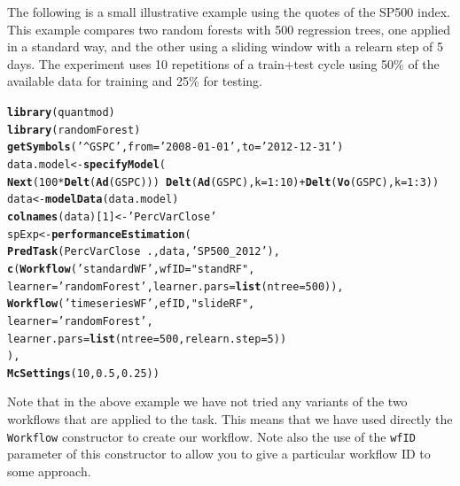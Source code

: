 \documentclass[10pt,a4paper]{article}\usepackage[]{graphicx}\usepackage[]{color}
\makeatletter
\newcommand{\hlnum}[1]{\textcolor[rgb]{0.686,0.059,0.569}{#1}}%
\newcommand{\hlstr}[1]{\textcolor[rgb]{0.192,0.494,0.8}{#1}}%
\newcommand{\hlopt}[1]{\textcolor[rgb]{0,0,0}{#1}}%
\newcommand{\hlstd}[1]{\textcolor[rgb]{0.345,0.345,0.345}{#1}}%
\newcommand{\hlkwb}[1]{\textcolor[rgb]{0.69,0.353,0.396}{#1}}%
\newcommand{\hlkwc}[1]{\textcolor[rgb]{0.333,0.667,0.333}{#1}}%
\newcommand{\hlkwd}[1]{\textcolor[rgb]{0.737,0.353,0.396}{\textbf{#1}}}%
\newenvironment{kframe}{%
 \def\at@end@of@kframe{}%
 \ifinner\ifhmode%
  \def\at@end@of@kframe{\end{minipage}}%
  \begin{minipage}{\columnwidth}%
 \fi\fi%
 \def\FrameCommand##1{\hskip\@totalleftmargin \hskip-\fboxsep
 \colorbox{shadecolor}{##1}\hskip-\fboxsep
     \hskip-\linewidth \hskip-\@totalleftmargin \hskip\columnwidth}%
 \MakeFramed {\advance\hsize-\width
   \@totalleftmargin\z@ \linewidth\hsize
   \@setminipage}}%
 {\par\unskip\endMakeFramed%
 \at@end@of@kframe}
\newenvironment{knitrout}{}{} %
\makeatother
\begin{document}
The following is a small illustrative example using the quotes of the
SP500 index. This example compares two random forests with 500
regression trees, one applied in a standard way, and the other using
a sliding window with a relearn step of 5 days. The experiment
uses 10 repetitions of a train+test cycle using 50\% of the available
data for training and 25\% for testing.

\begin{knitrout}\small
{}\color{fgcolor}\begin{kframe}
\begin{alltt}
\hlkwd{library}\hlstd{(quantmod)}
\hlkwd{library}\hlstd{(randomForest)}
\hlkwd{getSymbols}\hlstd{(}\hlstr{'^GSPC'}\hlstd{,}\hlkwc{from}\hlstd{=}\hlstr{'2008-01-01'}\hlstd{,}\hlkwc{to}\hlstd{=}\hlstr{'2012-12-31'}\hlstd{)}
\hlstd{data.model} \hlkwb{<-} \hlkwd{specifyModel}\hlstd{(}
  \hlkwd{Next}\hlstd{(}\hlnum{100}\hlopt{*}\hlkwd{Delt}\hlstd{(}\hlkwd{Ad}\hlstd{(GSPC)))} \hlopt{~} \hlkwd{Delt}\hlstd{(}\hlkwd{Ad}\hlstd{(GSPC),}\hlkwc{k}\hlstd{=}\hlnum{1}\hlopt{:}\hlnum{10}\hlstd{)}\hlopt{+}\hlkwd{Delt}\hlstd{(}\hlkwd{Vo}\hlstd{(GSPC),}\hlkwc{k}\hlstd{=}\hlnum{1}\hlopt{:}\hlnum{3}\hlstd{))}
\hlstd{data} \hlkwb{<-} \hlkwd{modelData}\hlstd{(data.model)}
\hlkwd{colnames}\hlstd{(data)[}\hlnum{1}\hlstd{]} \hlkwb{<-} \hlstr{'PercVarClose'}
\hlstd{spExp} \hlkwb{<-} \hlkwd{performanceEstimation}\hlstd{(}
  \hlkwd{PredTask}\hlstd{(PercVarClose} \hlopt{~} \hlstd{.,data,}\hlstr{'SP500_2012'}\hlstd{),}
  \hlkwd{c}\hlstd{(}\hlkwd{Workflow}\hlstd{(}\hlstr{'standardWF'}\hlstd{,}\hlkwc{wfID}\hlstd{=}\hlstr{"standRF"}\hlstd{,}
             \hlkwc{learner}\hlstd{=}\hlstr{'randomForest'}\hlstd{,}\hlkwc{learner.pars}\hlstd{=}\hlkwd{list}\hlstd{(}\hlkwc{ntree}\hlstd{=}\hlnum{500}\hlstd{)),}
    \hlkwd{Workflow}\hlstd{(}\hlstr{'timeseriesWF'}\hlstd{,efID,}\hlstr{"slideRF"}\hlstd{,}
             \hlkwc{learner}\hlstd{=}\hlstr{'randomForest'}\hlstd{,}
             \hlkwc{learner.pars}\hlstd{=}\hlkwd{list}\hlstd{(}\hlkwc{ntree}\hlstd{=}\hlnum{500}\hlstd{,}\hlkwc{relearn.step}\hlstd{=}\hlnum{5}\hlstd{))}
   \hlstd{),}
  \hlkwd{McSettings}\hlstd{(}\hlnum{10}\hlstd{,}\hlnum{0.5}\hlstd{,}\hlnum{0.25}\hlstd{))}
\end{alltt}
\end{kframe}
\end{knitrout}


Note that in the above example we have not tried any variants of the two workflows that are applied to the task. This means that we have used directly the \texttt{Workflow} constructor to create our workflow. Note also the use of the \texttt{wfID} parameter of this constructor to allow you to give a particular workflow ID to some approach.
\end{document}
